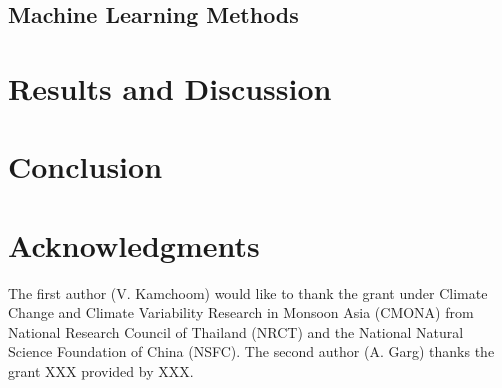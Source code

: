 \documentclass[12pt,a4paper]{article}
\begin{document}
	\subsection{Machine Learning Methods}
	
	\section{Results and Discussion}
	
	
	
	\section{Conclusion}
	
	\section*{Acknowledgments}
	
	The first author (V. Kamchoom) would like to thank the grant under Climate Change and Climate Variability Research in Monsoon Asia (CMONA) from National Research Council of Thailand (NRCT) and the National Natural Science Foundation of China (NSFC). The second author (A. Garg) thanks the grant XXX provided by XXX. 
	
	
	
	
\end{document}
